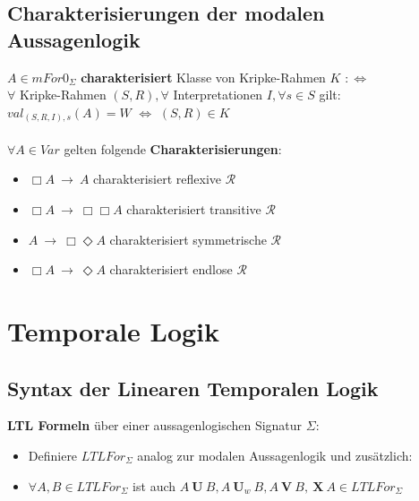 \documentclass[a4paper,11pt]{scrartcl}
\newcommand{\calR}{\mathcal{R}}
\newcommand{\tbf}{\textbf}
\newcommand{\Lra}{\Leftrightarrow}
\newcommand{\mForn}{mFor0_\Sigma}
\newcommand{\KR}{\calR}
\newcommand{\LTLF}{LTLFor_\Sigma}
\newcommand{\until}{\ \mathbf{U} \ }
\newcommand{\neXt}{\ \mathbf{X} \ }
\theoremstyle{default}
\begin{document}
\subsection{Charakterisierungen der modalen Aussagenlogik}
$A \in \mForn$ \tbf{charakterisiert} Klasse von Kripke-Rahmen $K$ $:\Lra$ \\
$\forall$ Kripke-Rahmen $(S,R), \forall$ Interpretationen  $I, \forall s \in S$ gilt: \\
$val_{(S,R,I),s}(A) = W$ $\Lra$ $(S,R) \in K$ \\
\ \\ $\forall A \in Var$ gelten folgende \tbf{Charakterisierungen}:
\begin{itemize}
 \item $\Box A \ \rightarrow \ A$ charakterisiert reflexive $\KR$
 \item $\Box A \ \rightarrow \ \Box \Box A$ charakterisiert transitive $\KR$
 \item $A \ \rightarrow \ \Box \Diamond A$ charakterisiert symmetrische $\KR$
 \item $\Box A \ \rightarrow \ \Diamond A$ charakterisiert endlose $\KR$
\end{itemize}


\newpage
\section{Temporale Logik}
\subsection{Syntax der Linearen Temporalen Logik}
\tbf{LTL Formeln} über einer aussagenlogischen Signatur $\Sigma$:
\begin{itemize}
 \item Definiere $\LTLF$ analog zur modalen Aussagenlogik und zusätzlich:
 \item $\forall A,B \in \LTLF$ ist auch $A \until B, A \ \mathbf{U}_w \ B, A \ \mathbf{V} \ B, \neXt A \in \LTLF$
\end{itemize}
\end{document}
